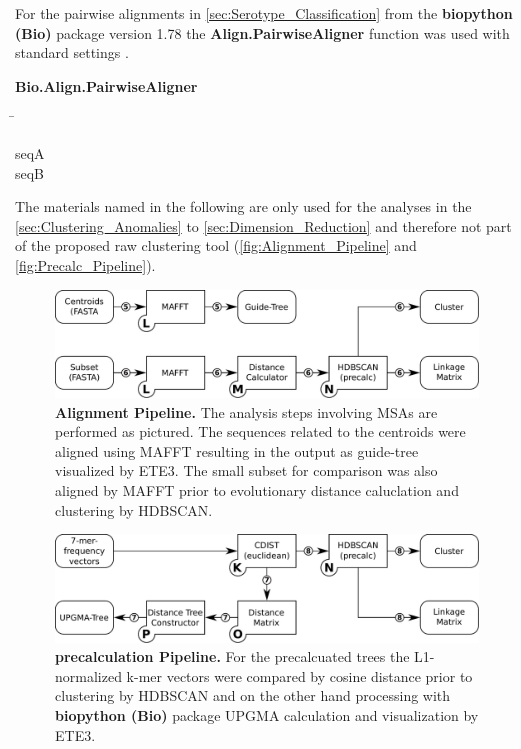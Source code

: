 For the pairwise alignments in \autoref{sec:Serotype_Classification} from the \textbf{biopython (Bio)} package version 1.78 the \textbf{Align.PairwiseAligner} function was used with standard settings \autocite{cock_biopython_2009}. 

\begin{leftbar}
    \textbf{Bio.Align.PairwiseAligner}
    \begin{nstabbing}
        \qquad\qquad\qquad\qquad\qquad\quad\=\kill
    
         seqA \\ 
         
         seqB 
        
    \end{nstabbing}
\end{leftbar}

The materials named in the following are only used for the analyses in the \autoref{sec:Clustering_Anomalies} to \autoref{sec:Dimension_Reduction} and therefore not part of the proposed raw clustering tool (\autoref{fig:Alignment_Pipeline} and \autoref{fig:Precalc_Pipeline}).

\begin{figure}[!hbt]
    \centering
    \includegraphics[width=\textwidth]{Graphics/Alignment.pdf}
    \caption[Alignment Pipeline]{\textbf{Alignment Pipeline.} The analysis steps involving \glspl{MSA} are performed as pictured. The sequences related to the centroids were aligned using MAFFT resulting in the output as guide-tree visualized by ETE3. The small subset for comparison was also aligned by MAFFT prior to evolutionary distance caluclation and clustering by \gls{HDBSCAN}.}
    \label{fig:Alignment_Pipeline}
\end{figure}

\begin{figure}[!hbt]
    \centering
    \includegraphics[width=\textwidth]{Graphics/Precalculated.pdf}
    \caption[Precalculation Pipeline]{\textbf{precalculation Pipeline.} For the precalcuated trees the L1-normalized k-mer vectors were compared by cosine distance prior to clustering by \gls{HDBSCAN} and on the other hand processing with \textbf{biopython (Bio)} package \gls{UPGMA} calculation and visualization by ETE3.}
    \label{fig:Precalc_Pipeline}
\end{figure}

